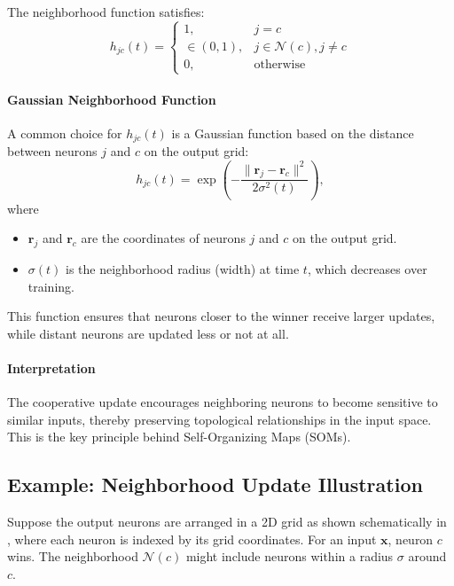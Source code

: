 The neighborhood function satisfies:
\[
h_{j c}(t) = \begin{cases}
1, & j = c \\
\in (0,1), & j \in \mathcal{N}(c), j \neq c \\
0, & \text{otherwise}
\end{cases}
\]

\paragraph{Gaussian Neighborhood Function}

A common choice for \(h_{j c}(t)\) is a Gaussian function based on the distance between neurons \(j\) and \(c\) on the output grid:
\begin{equation}
h_{j c}(t) = \exp \left( - \frac{\| \mathbf{r}_j - \mathbf{r}_{c} \|^2}{2 \sigma^2(t)} \right),
\label{eq:gaussian_neighborhood}
\end{equation}
where
\begin{itemize}
    \item \(\mathbf{r}_j\) and \(\mathbf{r}_{c}\) are the coordinates of neurons \(j\) and \(c\) on the output grid.
    \item \(\sigma(t)\) is the neighborhood radius (width) at time \(t\), which decreases over training.
\end{itemize}

This function ensures that neurons closer to the winner receive larger updates, while distant neurons are updated less or not at all.

\paragraph{Interpretation}

The cooperative update encourages neighboring neurons to become sensitive to similar inputs, thereby preserving topological relationships in the input space. This is the key principle behind Self-Organizing Maps (SOMs).

\subsection{Example: Neighborhood Update Illustration}
\label{sec:som_example_neighborhood_update_illustration}

Suppose the output neurons are arranged in a 2D grid as shown schematically in , where each neuron is indexed by its grid coordinates. For an input \(\mathbf{x}\), neuron \(c\) wins. The neighborhood \(\mathcal{N}(c)\) might include neurons within a radius \(\sigma\) around \(c\).

